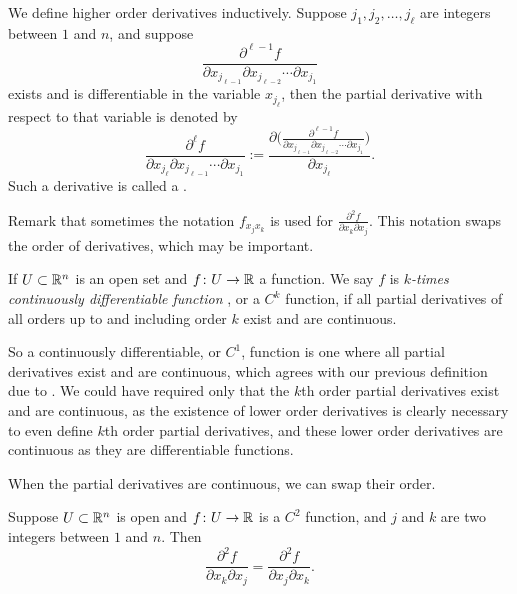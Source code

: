 We define higher order derivatives inductively.
Suppose $j_1,j_2,\ldots,j_\ell$ are integers between $1$ and $n$, and
suppose 
\begin{equation*}
\frac{\partial^{\ell-1} f}{\partial x_{j_{\ell-1}} \partial x_{j_{\ell-2}} \cdots \partial x_{j_1}}
\end{equation*}
exists and is differentiable in the variable $x_{j_{\ell}}$, then the
partial derivative with respect to that variable is denoted by
\begin{equation*}
\frac{\partial^{\ell} f}{\partial x_{j_{\ell}} \partial x_{j_{\ell-1}}
\cdots \partial x_{j_1}}
:= 
\frac{\partial \bigl( \frac{\partial^{\ell-1} f}{\partial x_{j_{\ell-1}} \partial
x_{j_{\ell-2}} \cdots \partial x_{j_1}} \bigr)}{\partial x_{j_{\ell}}} .
\end{equation*}
Such a derivative is called a
\emph{}.

Remark that sometimes the notation $f_{x_j x_k}$ is used for
$\frac{\partial^2 f}{\partial x_k \partial x_j}$.  This notation
swaps the order of derivatives, which may be important.

\begin{defn}
If $U \subset {\mathbb{R}}^n$ is an open set and
$f \colon U \to {\mathbb{R}}$ a function.  We say $f$ is
\emph{$k$-times continuously differentiable function}%
,
or a $C^k$ function, if all partial derivatives of all orders up to and
including order $k$ exist and are continuous.
\end{defn}

So a continuously differentiable, or $C^1$, function is one where all partial
derivatives exist and are continuous, which agrees with our previous
definition due to .  We
could have required only that the $k$th order partial derivatives exist and
are continuous, as the existence of lower order derivatives is clearly
necessary to even define $k$th order partial derivatives,
and these lower order derivatives are continuous as they are differentiable
functions.

When the partial derivatives are continuous, we can swap their order.

\begin{prop} \label{mv:prop:swapders}
Suppose $U \subset {\mathbb{R}}^n$ is open and $f \colon U \to {\mathbb{R}}$ is a $C^2$
function, and $j$ and $k$ are two integers between $1$ and $n$.  Then
\begin{equation*}
\frac{\partial^2 f}{\partial x_k \partial x_j}
=
\frac{\partial^2 f}{\partial x_j \partial x_k} .
\end{equation*}
\end{prop}

